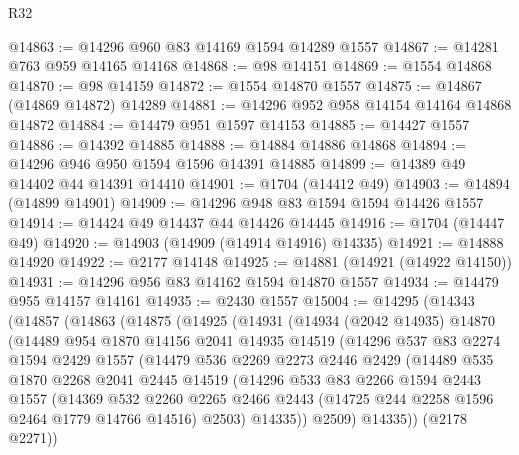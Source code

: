 \begin{lexlean}{R32}
\begin{coremodule}
@14863 := @14296 @960 @83 @14169 @1594 @14289 @1557
@14867 := @14281 @763 @959 @14165 @14168
@14868 := @98 @14151
@14869 := @1554 @14868
@14870 := @98 @14159
@14872 := @1554 @14870 @1557
@14875 := @14867 (@14869 @14872) @14289
@14881 := @14296 @952 @958 @14154 @14164 @14868 @14872
@14884 := @14479 @951 @1597 @14153
@14885 := @14427 @1557
@14886 := @14392 @14885
@14888 := @14884 @14886 @14868
@14894 := @14296 @946 @950 @1594 @1596 @14391 @14885
@14899 := @14389 @49 @14402 @44 @14391 @14410
@14901 := @1704 (@14412 @49)
@14903 := @14894 (@14899 @14901)
@14909 := @14296 @948 @83 @1594 @1594 @14426 @1557
@14914 := @14424 @49 @14437 @44 @14426 @14445
@14916 := @1704 (@14447 @49)
@14920 := @14903 (@14909 (@14914 @14916) @14335)
@14921 := @14888 @14920
@14922 := @2177 @14148
@14925 := @14881 (@14921 (@14922 @14150))
@14931 := @14296 @956 @83 @14162 @1594 @14870 @1557
@14934 := @14479 @955 @14157 @14161
@14935 := @2430 @1557
@15004 := @14295
    (@14343
      (@14857
        (@14863
          (@14875
            (@14925
              (@14931
                (@14934
                  (@2042 @14935)
                  @14870
                  (@14489
                    @954
                    @1870
                    @14156
                    @2041
                    @14935
                    @14519
                    (@14296
                      @537
                      @83
                      @2274
                      @1594
                      @2429
                      @1557
                      (@14479
                        @536
                        @2269
                        @2273
                        @2446
                        @2429
                        (@14489
                          @535
                          @1870
                          @2268
                          @2041
                          @2445
                          @14519
                          (@14296
                            @533
                            @83
                            @2266
                            @1594
                            @2443
                            @1557
                            (@14369
                              @532
                              @2260
                              @2265
                              @2466
                              @2443
                              (@14725 @244 @2258 @1596 @2464 @1779 @14766 @14516)
                              @2503)
                            @14335))
                        @2509)
                      @14335))
                  (@2178 @2271))

\end{coremodule}
\end{lexlean}
